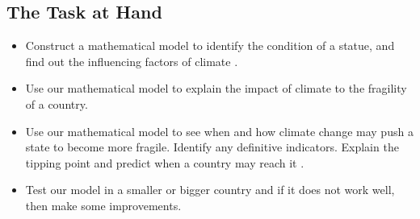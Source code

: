 \documentclass{mcmthesis}
\begin{document}
\subsection{The Task at Hand}
\begin{itemize}
\item Construct a mathematical model to identify the condition of a statue, and find out the influencing factors of climate .
\item Use our mathematical model to explain the impact of climate to the fragility of a country.
\item 	Use our mathematical model to see when and how climate change may push a state to become more fragile. Identify any definitive indicators. Explain the tipping point and predict when a country may reach it .
\item Test our model in a smaller or bigger country and if it does not work well, then make some improvements.
\end{itemize}
\end{document}
